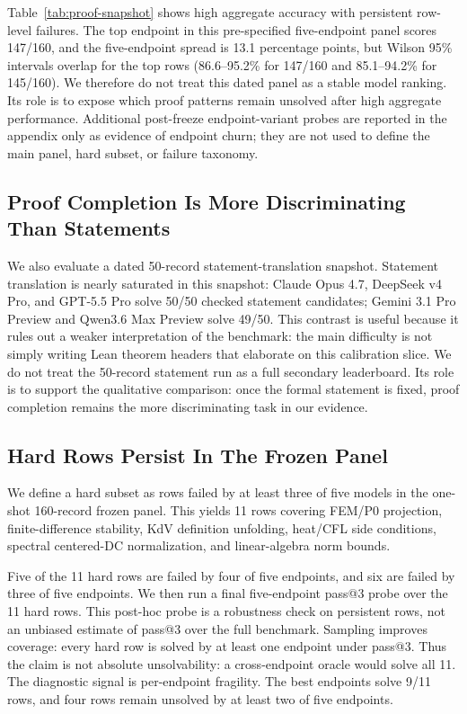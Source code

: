 \documentclass{article}
\begin{document}
Table~\ref{tab:proof-snapshot} shows high aggregate accuracy with persistent
row-level failures. The top endpoint in this pre-specified five-endpoint panel
scores 147/160, and the five-endpoint spread is 13.1 percentage points, but
Wilson 95\% intervals overlap for the top rows (86.6--95.2\% for 147/160 and
85.1--94.2\% for 145/160). We therefore do not treat this dated panel as a
stable model ranking. Its role is to expose which proof patterns remain
unsolved after high aggregate performance. Additional post-freeze
endpoint-variant probes are reported in the appendix only as evidence of
endpoint churn; they are not used to define the main panel, hard subset, or
failure taxonomy.

\subsection{Proof Completion Is More Discriminating Than Statements}

We also evaluate a dated 50-record statement-translation snapshot. Statement
translation is nearly saturated in this snapshot: Claude Opus 4.7,
DeepSeek v4 Pro, and GPT-5.5 Pro solve 50/50 checked statement candidates;
Gemini 3.1 Pro Preview and Qwen3.6 Max Preview solve 49/50. This contrast is
useful because it rules out a weaker interpretation of the benchmark: the
main difficulty is not simply writing Lean theorem headers that elaborate on
this calibration slice. We do not treat the 50-record statement run as a full
secondary leaderboard. Its role is to support the qualitative comparison:
once the formal statement is fixed, proof completion remains the more
discriminating task in our evidence.

\subsection{Hard Rows Persist In The Frozen Panel}

We define a hard subset as rows failed by at least three of five models in the
one-shot 160-record frozen panel. This yields 11 rows covering FEM/P0
projection, finite-difference stability, KdV definition unfolding, heat/CFL
side conditions, spectral centered-DC normalization, and linear-algebra norm
bounds.

Five of the 11 hard rows are failed by four of five endpoints, and six are
failed by three of five endpoints. We then run a final five-endpoint pass@3
probe over the 11 hard rows. This post-hoc probe is a robustness check on
persistent rows, not an unbiased estimate of pass@3 over the full benchmark.
Sampling improves coverage: every hard row is solved by at least one endpoint
under pass@3. Thus the claim is not absolute unsolvability: a cross-endpoint
oracle would solve all 11. The diagnostic signal is per-endpoint fragility.
The best endpoints solve 9/11 rows, and four rows remain unsolved by at least
two of five endpoints.
\end{document}

